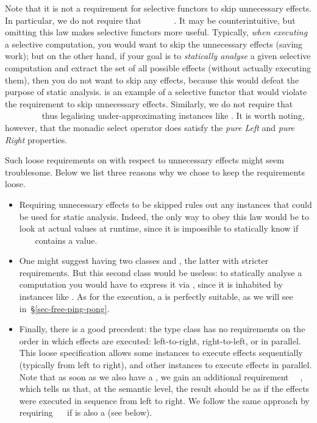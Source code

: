 {Note that it is not a requirement for selective functors to skip unnecessary
effects. In particular, we do not require that
~~~~~\hs{=}~~. It may be
counterintuitive, but omitting this law makes selective functors more useful.
Typically, \emph{when executing} a selective computation, you would want to skip
the unnecessary effects (saving work); but on the other hand, if your goal is to
\emph{statically analyse} a given selective computation and extract the set of
all possible effects (without actually executing them), then you do not want to
skip any effects, because this would defeat the purpose of static analysis.
 is an example of a selective functor that would violate the
requirement to skip unnecessary effects. Similarly, we do not require that
~~~~~\hs{=}~~~
thus legalising under-approximating instances like . It is worth
noting, however, that the monadic select operator  does satisfy the
\emph{pure Left} and \emph{pure Right} properties.

Such loose requirements on  with respect to unnecessary effects might
seem troublesome. Below we list three reasons why we chose to keep the
requirements loose.
\begin{itemize}
    \item Requiring unnecessary effects to be skipped rules out any instances
    that could be used for static analysis. Indeed, the only way to obey this
    law would be to look at actual values at runtime, since it is impossible to
    statically know if ~~~ contains a 
    value.
    \item One might suggest having two classes  and
    , the latter with stricter requirements. But this second
    class would be useless: to statically analyse a computation you would have
    to express it via , since it is inhabited by instances like
    . As for the execution, a  is perfectly suitable, as we
    will see in~\S\ref{sec-free-ping-pong}.
    \item Finally, there is a good precedent: the  type class
    has no requirements on the order in which effects are executed:
    left-to-right, right-to-left, or in parallel. This loose specification
    allows some instances to execute effects sequentially (typically from left
    to right), and other instances to execute effects in parallel. Note that as
    soon as we also have a , we gain an additional requirement
    \hs{(<*>)}~\hs{=}~, which tells us that, at the semantic level, the
    result should be as if the effects were executed in sequence from left to
    right. We follow the same approach by requiring
    ~\hs{=}~ if  is also a  (see below).
\end{itemize}

}
